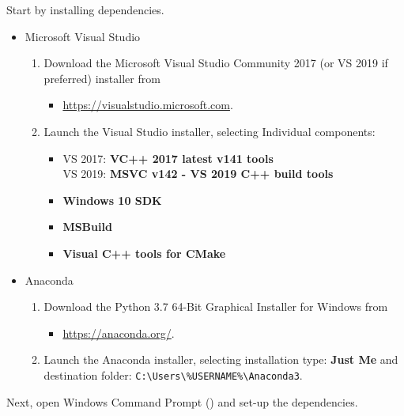 \noindent Start by installing \escript dependencies.

\begin{itemize}
\item Microsoft Visual Studio
\begin{enumerate}
\item Download the Microsoft Visual Studio Community 2017 (or VS 2019 if
preferred) installer from
\begin{itemize}
\item[] \url{https://visualstudio.microsoft.com}.
\end{itemize}
\item Launch the Visual Studio installer, selecting Individual components:
\begin{itemize}
\item VS 2017: \textbf{VC++ 2017 latest v141 tools} \\
VS 2019: \textbf{MSVC v142 - VS 2019 C++ build tools}
\item \textbf{Windows 10 SDK}
\item \textbf{MSBuild}
\item \textbf{Visual C++ tools for CMake}
\end{itemize}
\end{enumerate}
\item Anaconda
\begin{enumerate}
\item Download the Python 3.7 64-Bit Graphical Installer for Windows from
\begin{itemize}
\item[] \url{https://anaconda.org/}.
\end{itemize}
\item Launch the Anaconda installer, selecting installation type: \textbf{Just
Me} and destination folder: \newline \verb!C:\Users\%USERNAME%\Anaconda3!.
\end{enumerate}
\end{itemize}

\noindent Next, open Windows Command Prompt () and set-up the
\escript dependencies.

